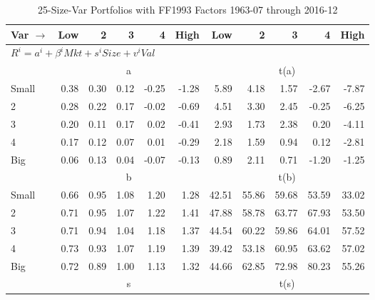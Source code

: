 
\begin{table}[!ht]
\footnotesize
\centering
\caption{25-Size-Var Portfolios with FF1993 Factors 1963-07 through 2016-12}
\begin{tabular}{lrrrrrrrrrr}
  \toprule
    Var $\rightarrow$ & Low & 2 & 3 & 4 & High & Low & 2 & 3 & 4 & High \\ 
  \midrule
  \multicolumn{11}{l}{$R^i=a^i+\beta^iMkt+s^iSize+v^iVal$} \\

  
    
      & \multicolumn{5}{c}{a} & \multicolumn{5}{c}{t(a)}
    
    \\
      \cmidrule(r){2-6} \cmidrule(r){7-11}

    Small   & 0.38  & 0.30  & 0.12  & -0.25  & -1.28  & 5.89  & 4.18  & 1.57  & -2.67  & -7.87  \\
         2  & 0.28  & 0.22  & 0.17  & -0.02  & -0.69  & 4.51  & 3.30  & 2.45  & -0.25  & -6.25  \\
         3  & 0.20  & 0.11  & 0.17  & 0.02  & -0.41  & 2.93  & 1.73  & 2.38  & 0.20  & -4.11  \\
         4  & 0.17  & 0.12  & 0.07  & 0.01  & -0.29  & 2.18  & 1.59  & 0.94  & 0.12  & -2.81  \\
    Big     & 0.06  & 0.13  & 0.04  & -0.07  & -0.13  & 0.89  & 2.11  & 0.71  & -1.20  & -1.25  \\

  
    
      & \multicolumn{5}{c}{b} & \multicolumn{5}{c}{t(b)}
    
    \\
      \cmidrule(r){2-6} \cmidrule(r){7-11}

    Small   & 0.66  & 0.95  & 1.08  & 1.20  & 1.28  & 42.51  & 55.86  & 59.68  & 53.59  & 33.02  \\
         2  & 0.71  & 0.95  & 1.07  & 1.22  & 1.41  & 47.88  & 58.78  & 63.77  & 67.93  & 53.50  \\
         3  & 0.71  & 0.94  & 1.04  & 1.18  & 1.37  & 44.54  & 60.22  & 59.86  & 64.01  & 57.52  \\
         4  & 0.73  & 0.93  & 1.07  & 1.19  & 1.39  & 39.42  & 53.18  & 60.95  & 63.62  & 57.02  \\
    Big     & 0.72  & 0.89  & 1.00  & 1.13  & 1.32  & 44.66  & 62.85  & 72.98  & 80.23  & 55.26  \\

  
    
      & \multicolumn{5}{c}{s} & \multicolumn{5}{c}{t(s)}
    

\end{tabular}
\end{table}

